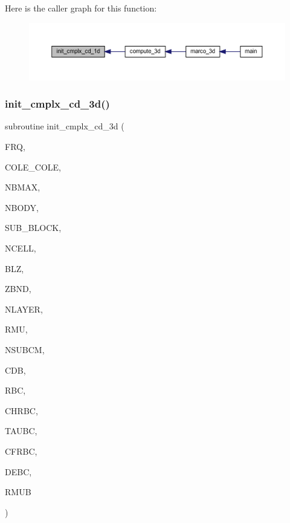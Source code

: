 Here is the caller graph for this function\+:
\nopagebreak
\begin{figure}[H]
\begin{center}
\leavevmode
\includegraphics[width=350pt]{Marco_8f90_ab5e1d6b86ed64b774c25c5b69552f078_icgraph}
\end{center}
\end{figure}
\mbox{\label{Marco_8f90_aaf5e8f1fe701ea6d58511ac2fabcd83c}} 
\subsubsection{\texorpdfstring{init\+\_\+cmplx\+\_\+cd\+\_\+3d()}{init\_cmplx\_cd\_3d()}}
{\footnotesize\ttfamily subroutine init\+\_\+cmplx\+\_\+cd\+\_\+3d (\begin{DoxyParamCaption}\item[{real}]{F\+RQ,  }\item[{integer}]{C\+O\+L\+E\+\_\+\+C\+O\+LE,  }\item[{integer}]{N\+B\+M\+AX,  }\item[{integer}]{N\+B\+O\+DY,  }\item[{integer, dimension(nbody)}]{S\+U\+B\+\_\+\+B\+L\+O\+CK,  }\item[{integer, dimension(nbmax,nbody)}]{N\+C\+E\+LL,  }\item[{real, dimension(nbmax,nbody)}]{B\+LZ,  }\item[{real, dimension(0\+:nlayer)}]{Z\+B\+ND,  }\item[{integer}]{N\+L\+A\+Y\+ER,  }\item[{real, dimension(nlayer)}]{R\+MU,  }\item[{integer}]{N\+S\+U\+B\+CM,  }\item[{complex, dimension(nsubcm,nbmax)}]{C\+DB,  }\item[{real, dimension(nbmax,nbody)}]{R\+BC,  }\item[{real, dimension(nbmax,nbody)}]{C\+H\+R\+BC,  }\item[{real, dimension(nbmax,nbody)}]{T\+A\+U\+BC,  }\item[{real, dimension(nbmax,nbody)}]{C\+F\+R\+BC,  }\item[{real, dimension(nbmax,nbody)}]{D\+E\+BC,  }\item[{real, dimension(nbmax,nbody)}]{R\+M\+UB }\end{DoxyParamCaption})}

